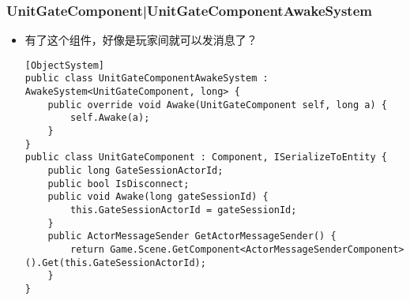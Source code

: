 \documentclass[9pt, b5paper]{article}
\begin{document}
\subsubsection{UnitGateComponent|UnitGateComponentAwakeSystem}
\label{sec-1-6-1}
\begin{itemize}
\item 有了这个组件，好像是玩家间就可以发消息了？
\begin{verbatim}
[ObjectSystem]
public class UnitGateComponentAwakeSystem : AwakeSystem<UnitGateComponent, long> {
    public override void Awake(UnitGateComponent self, long a) {
        self.Awake(a);
    }
}
public class UnitGateComponent : Component, ISerializeToEntity {
    public long GateSessionActorId;
    public bool IsDisconnect;
    public void Awake(long gateSessionId) {
        this.GateSessionActorId = gateSessionId;
    }
    public ActorMessageSender GetActorMessageSender() {
        return Game.Scene.GetComponent<ActorMessageSenderComponent>().Get(this.GateSessionActorId);
    }
}
\end{verbatim}
\end{itemize}
\end{document}
